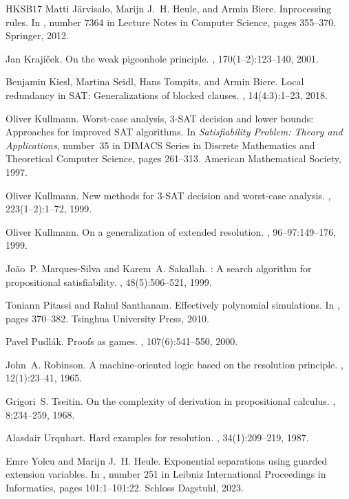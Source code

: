 \documentclass[10pt,a4paper]{article}
\begin{document}
\begin{thebibliography}{HKSB17}
  Matti J{\"a}rvisalo, Marijn J.~H. Heule, and Armin Biere.
  \newblock Inprocessing rules.
  \newblock In {\em {}}, number 7364 in Lecture Notes in Computer Science,
  pages 355--370. Springer, 2012.

  Jan Kraj{\'i}{\v c}ek.
  \newblock On the weak pigeonhole principle.
  , 170(1--2):123--140, 2001.

  Benjamin Kiesl, Martina Seidl, Hans Tompits, and Armin Biere.
  \newblock Local redundancy in {SAT}: Generalizations of blocked clauses.
  , 14(4:3):1--23, 2018.

  Oliver Kullmann.
  \newblock Worst-case analysis, {3-SAT} decision and lower bounds: Approaches
  for improved {SAT} algorithms.
  \newblock In {\em Satisfiability Problem: Theory and Applications}, number~35
  in DIMACS Series in Discrete Mathematics and Theoretical Computer Science,
  pages 261--313. American Mathematical Society, 1997.

  Oliver Kullmann.
  \newblock New methods for {3-SAT} decision and worst-case analysis.
  , 223(1--2):1--72, 1999.

  Oliver Kullmann.
  \newblock On a generalization of extended resolution.
  , 96--97:149--176, 1999.

  Jo{\~a}o~P. {Marques-Silva} and Karem~A. Sakallah.
  : A search algorithm for propositional satisfiability.
  , 48(5):506--521, 1999.

  Toniann Pitassi and Rahul Santhanam.
  \newblock Effectively polynomial simulations.
  \newblock In {\em {}}, pages 370--382. Tsinghua University Press, 2010.

  Pavel Pudl{\'a}k.
  \newblock Proofs as games.
  , 107(6):541--550, 2000.

  John~A. Robinson.
  \newblock A machine-oriented logic based on the resolution principle.
  , 12(1):23--41, 1965.

  Grigori~S. Tseitin.
  \newblock On the complexity of derivation in propositional calculus.
  , 8:234--259, 1968.

  Alasdair Urquhart.
  \newblock Hard examples for resolution.
  , 34(1):209--219, 1987.

  Emre Yolcu and Marijn J.~H. Heule.
  \newblock Exponential separations using guarded extension variables.
  \newblock In {\em {}}, number 251 in Leibniz International Proceedings
  in Informatics, pages 101:1--101:22. Schloss Dagstuhl, 2023.

\end{thebibliography}
\end{document}
